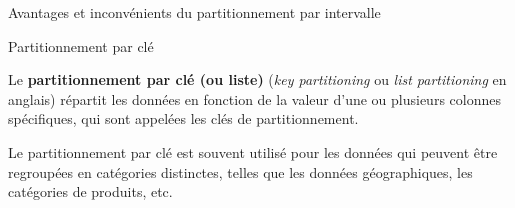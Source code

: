 \begin{frame}{Avantages et inconvénients du partitionnement par intervalle}



    \pause


\end{frame}


\begin{frame}{Partitionnement par clé}

    \begin{definitionbox}
        Le \textbf{partitionnement par clé (ou liste)} (\textit{key partitioning} ou \textit{list partitioning} en anglais) répartit les données en fonction de la valeur d'une ou plusieurs colonnes spécifiques, qui sont appelées les clés de partitionnement.
    \end{definitionbox}

    \pause

    \begin{noteblock}
        Le partitionnement par clé est souvent utilisé pour les données qui peuvent être regroupées en catégories distinctes, telles que les données géographiques, les catégories de produits, etc.
    \end{noteblock}
\end{frame}

